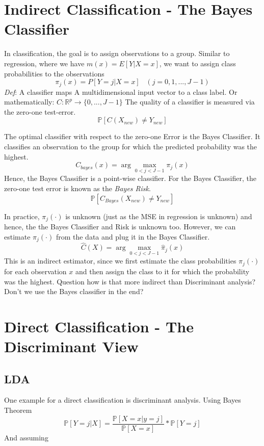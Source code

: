 \documentclass[]{book}
\begin{document}
\section{Indirect Classification - The Bayes
Classifier}\label{indirect-classification---the-bayes-classifier}

In classification, the goal is to assign observations to a group.
Similar to regression, where we have \(m(x) = E[Y | X = x]\), we want to
assign class probabilities to the observations
\[\pi_j (x) = P[Y = j | X = x] \;\;\;  (j = 0,1, ..., J-1)  \]
\emph{Def}: A classifier maps A multidimensional input vector to a class
label. Or mathematically:
\(C: \mathbb{R}^p \rightarrow \{0, ..., J-1\}\) The quality of a
classifier is measured via the zero-one test-error.
\[\mathbb{P}[C(X_{new}) \neq Y_{new}] \]

The optimal classifier with respect to the zero-one Error is the Bayes
Classifier. It classifies an observation to the group for which the
predicted probability was the highest.
\[ C_{bayes}(x) = \arg\max_{0<j<J-1}\pi_j(x)\] Hence, the Bayes
Classifier is a point-wise classifier. For the Bayes Classifier, the
zero-one test error is known as the \emph{Bayes Risk}.
\[ \mathbb{P}[C_{Bayes}(X_{new}) \neq Y_{new}]\]

In practice, \(\pi_j(\cdot)\) is unknown (just as the MSE in regression
is unknown) and hence, the the Bayes Classifier and Risk is unknown too.
However, we can estimate \(\pi_j(\cdot)\) from the data and plug it in
the Bayes Classifier. \[\hat{C}(X) = \arg\max_{0<j<J-1}\hat{\pi}_j(x)\]
This is an indirect estimator, since we first estimate the class
probabilities \(\pi_j(\cdot)\) for each observation \(x\) and then
assign the class to it for which the probability was the highest.
Question how is that more indirect than Discriminant analysis? Don't we
use the Bayes classifier in the end?

\section{Direct Classification - The Discriminant
View}\label{direct-classification---the-discriminant-view}

\subsection{LDA}\label{lda}

One example for a direct classification is discriminant analysis. Using
Bayes Theorem
\[ \mathbb{P}[Y = j | X] = \frac{\mathbb{P}[X = x | y = j]}{\mathbb{P}[X = x]}*\mathbb{P}[Y = j] \]
And assuming
\end{document}
